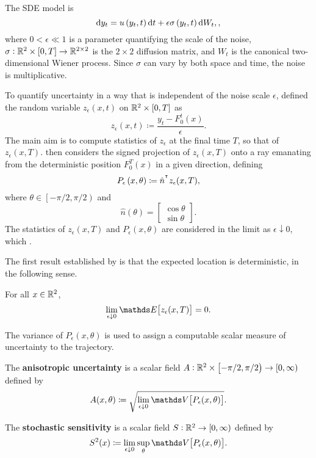 
The SDE model is
\begin{equation}
	\sde{y_t}{u\left(y_t, t\right)}{\epsilon\sigma\left(y_t, t\right)},
	\label{eqn:ss_sde},
\end{equation}
where \(0 < \epsilon \ll 1\) is a parameter quantifying the scale of the noise, \(\sigma:	\mathbb{R}^2\times[0,T] \to \mathbb{R}^{2\times 2}\) is the \(2\times 2\) diffusion matrix, and \(W_t\) is the canonical two-dimensional Wiener process.
Since \(\sigma\) can vary by both space and time, the noise is multiplicative.

To quantify uncertainty in a way that is independent of the noise scale \(\epsilon\), \cite{Balasuriya_2020_StochasticSensitivityComputable} defined the random variable \(z_\epsilon\left(x,t\right)\) on \(\mathbb{R}^2 \times [0,T]\) as
\[
	z_\epsilon\left(x,t\right) \coloneqq \frac{y_t - F_0^t(x)}{\epsilon}.
\]
The main aim is to compute statistics of \(z_\epsilon\) at the final time \(T\), so that of \(z_\epsilon\left(x,T\right)\).
\citet{Balasuriya_2020_StochasticSensitivityComputable} then considers the signed projection of \(z_\epsilon\left(x,T\right)\) onto a ray emanating from the deterministic position \(F_0^T(x)\) in a given direction, defining
\[
	P_\epsilon\left(x,\theta\right) \coloneqq \hat{n}^{^{\intercal}} z_\epsilon(x,T),
\]
where \(\theta \in \left[-\pi/2, \pi/2\right)\) and
\[
	\hat{n}(\theta) = \begin{bmatrix}
		\cos{\theta} \\
		\sin{\theta}
	\end{bmatrix}.
\]
The statistics of \(z_\epsilon\left(x,T\right)\) and \(P_\epsilon(x,\theta)\) are considered in the limit as \(\epsilon\downarrow 0\), which .

The first result established by \cite{Balasuriya_2020_StochasticSensitivityComputable} is that the expected location is deterministic, in the following sense.
\begin{theorem}
	For all \(x \in \mathbb{R}^2\),
	\[
		\lim_{\epsilon\downarrow 0}\avg{z_\epsilon(x,T)} = 0.
	\]
\end{theorem}

The variance of \(P_\epsilon\left(x,\theta\right)\) is used to assign a computable scalar measure of uncertainty to the trajectory.

\begin{defn}
	\begin{alpharate}
		\item The \textbf{anisotropic uncertainty} is a scalar field \(A: \mathbb{R}^2\times\left[-\pi/2, \pi/2\right) \to [0,\infty)\) defined by
		\[
			A(x,\theta) \coloneqq \sqrt{\lim_{\epsilon\downarrow 0}\var{P_\epsilon(x,\theta)}}.
		\]

		\item The \textbf{stochastic sensitivity} is a scalar field \(S: \mathbb{R}^2 \to [0,\infty)\) defined by
		\[
			S^2(x) \coloneqq \lim_{\epsilon\downarrow 0}\sup_{\theta}{\var{P_\epsilon(x,\theta)}}.
		\]
	\end{alpharate}
\end{defn}

